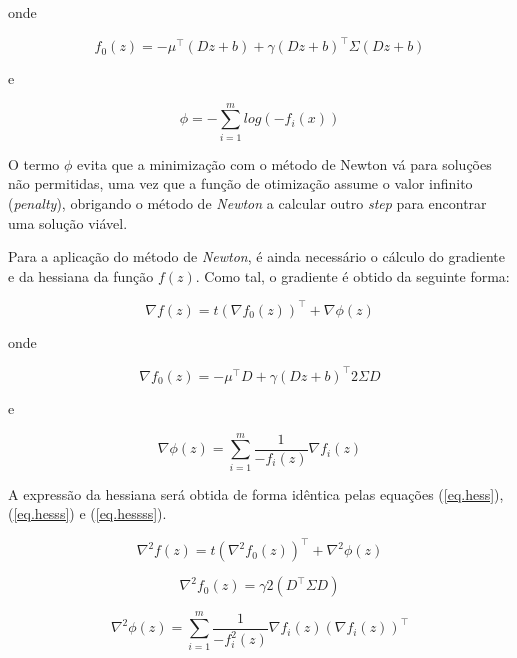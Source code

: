 \documentclass[a4paper]{IEEEtran}
\begin{document}
onde

\begin{equation}
f_0 (z) = -\mu^\top (D z + b) + \gamma (D z + b)^\top \Sigma (D z + b)
\end{equation}

e

\begin{equation}
\phi = -\sum_{i=1}^{m} log(-f_i(x))
\end{equation}

O termo $\phi$ evita que a minimização com o método de Newton vá para soluções não permitidas, uma vez que a função de otimização assume o valor infinito (\textit{penalty}), obrigando o método de \textit{Newton} a calcular outro \textit{step} para encontrar uma solução viável.

Para a aplicação do método de \textit{Newton}, é ainda necessário o cálculo do gradiente e da hessiana da função $f (z)$. Como tal, o gradiente é obtido da seguinte forma:

\begin{equation}
\nabla f(z) = t (\nabla f_0(z))^\top + \nabla \phi (z)
\end{equation}

onde

\begin{equation}
\nabla f_0 (z) = -\mu^\top D + \gamma (D z + b)^\top 2 \Sigma D  
\end{equation}

e

\begin{equation}
\nabla \phi (z) = \sum_{i=1}^{m} \frac{1}{-f_i (z)} \nabla f_i (z) 
\end{equation}

A expressão da hessiana será obtida de forma idêntica pelas equações (\ref{eq.hess}), (\ref{eq.hesss}) e (\ref{eq.hessss}).

\begin{equation}
\label{eq.hess}
\nabla^2 f(z) = t (\nabla^2 f_0(z))^\top + \nabla^2 \phi (z)
\end{equation}

\begin{equation}
\label{eq.hesss}
\nabla^2 f_0 (z) = \gamma 2 (D^\top \Sigma D) 
\end{equation}

\begin{equation}
\label{eq.hessss}
\nabla^2 \phi (z) = \sum_{i=1}^{m} \frac{1}{-f_i^2 (z)} \nabla f_i (z) (\nabla f_i (z))^\top
\end{equation}
\end{document}
